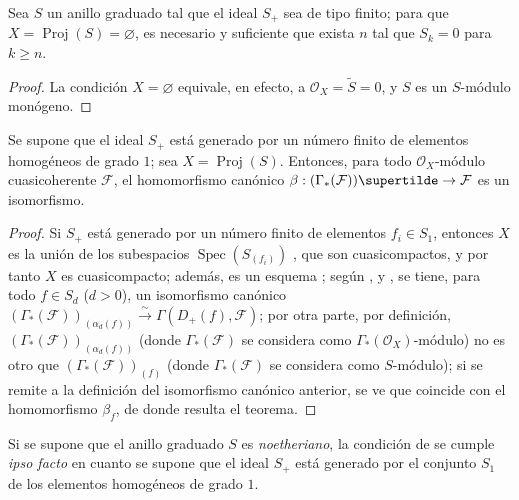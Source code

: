 \documentclass[oneside,10pt]{amsart}
\makeatletter
\renewcommand{\geq}{\geqslant}
\newcommand{\ega@arrow}[2]{\mathchoice{#1}{#2}{#2}{#2}}
\renewcommand{\to}{\ega@arrow{\longrightarrow}{\rightarrow}}
\let\EGAOriginalLabel\label
\renewcommand{\label}[1]{\phantomsection\EGAOriginalLabel{#1}}
\makeatother
\begin{document}
\begin{corollary}[2.7.4]
\label{II.2.7.4-fr}
Sea $S$ un anillo graduado tal que el ideal $S_+$ sea de tipo finito; para que $X=\operatorname{Proj}(S)=\varnothing$, es necesario y suficiente que exista $n$ tal que $S_k=0$ para $k\geq n$.
\end{corollary}

\begin{proof}
La condición $X=\varnothing$ equivale, en efecto, a $\mathcal{O}_X=\widetilde{S}=0$, y $S$ es un $S$-módulo monógeno.
\end{proof}

\begin{theorem}[2.7.5]
\label{II.2.7.5-fr}
Se supone que el ideal $S_+$ está generado por un número finito de elementos homogéneos de grado $1$; sea $X=\operatorname{Proj}(S)$.
Entonces, para todo $\mathcal{O}_X$-módulo cuasicoherente $\mathcal{F}$, el homomorfismo canónico $\beta:(\Gamma_*(\mathcal{F}))\supertilde
\to\mathcal{F}$  es un isomorfismo.
\end{theorem}

\begin{proof}
Si $S_+$ está generado por un número finito de elementos $f_i\in S_1$, entonces $X$ es la unión de los subespacios $\operatorname{Spec}(S_{(f_i)})$ , que son cuasicompactos, y por tanto $X$ es cuasicompacto; además, es un esquema ; según ,  y , se tiene, para todo $f\in S_d$ ($d>0$), un isomorfismo canónico $(\Gamma_*(\mathcal{F}))_{(\alpha_d(f))}\xrightarrow{\sim}
\Gamma(D_+(f),\mathcal{F})$; por otra parte, por definición, $(\Gamma_*(\mathcal{F}))_{(\alpha_d(f))}$ (donde $\Gamma_*(\mathcal{F})$ se considera como $\Gamma_*(\mathcal{O}_X)$-módulo) no es otro que $(\Gamma_*(\mathcal{F}))_{(f)}$ (donde $\Gamma_*(\mathcal{F})$ se considera como $S$-módulo); si se remite a la definición  del isomorfismo canónico anterior, se ve que coincide con el homomorfismo $\beta_f$, de donde resulta el teorema.
\end{proof}

\begin{remark}[2.7.6]
\label{II.2.7.6-fr}
Si se supone que el anillo graduado $S$ es \emph{noetheriano}, la condición de  se cumple \emph{ipso facto} en cuanto se supone que el ideal $S_+$ está generado por el conjunto $S_1$ de los elementos homogéneos de grado $1$.
\end{remark}
\end{document}
